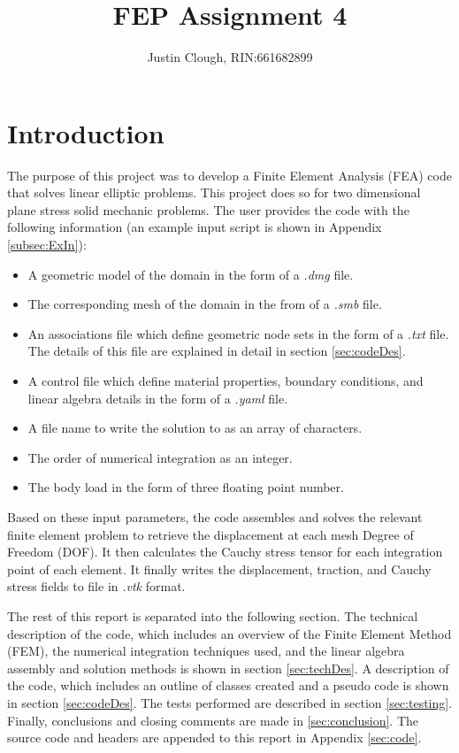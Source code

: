 \documentclass[a4paper, 12pt]{article}
\author{Justin Clough, RIN:661682899}
\title{FEP Assignment 4}
\begin{document}
\maketitle

\newpage
\section{Introduction} \label{sec:intro}
The purpose of this project was to develop a Finite
Element Analysis (FEA) code that solves linear
elliptic problems. This project does so for
two dimensional plane stress solid mechanic problems. The user
provides the code with the following information
(an example input script is shown in
Appendix \ref{subsec:ExIn}):

\begin{itemize}
  \item A geometric model of the domain in the
        form of a \emph{.dmg} file.
  \item The corresponding mesh of the domain in the
        from of a \emph{.smb} file.
  \item An associations file which define geometric
        node sets in the form of a \emph{.txt} file. The
        details of this file are explained in detail in
        section \ref{sec:codeDes}.
  \item A control file which define material properties,
        boundary conditions, and linear algebra details in
        the form of a \emph{.yaml} file.
  \item A file name to write the solution to as an array of
        characters.
  \item The order of numerical integration as an integer.
  \item The body load in the form of three floating point
        number.
\end{itemize}

Based on these input parameters, the code assembles and
solves the relevant finite element problem to retrieve
the displacement at each mesh Degree of Freedom (DOF).
It then calculates the Cauchy stress tensor for each
integration point of each element. It finally writes
the displacement, traction, and Cauchy stress fields to
file in \emph{.vtk} format.

The rest of this report is separated into the following
section. The technical description of the code, which
includes an overview of the Finite Element Method (FEM),
the numerical integration techniques used, and the
linear algebra assembly and solution methods is shown in
section \ref{sec:techDes}. A description of the code, which
includes an outline of classes created and a pseudo code
is shown in section \ref{sec:codeDes}. The tests performed
are described in section \ref{sec:testing}. Finally,
conclusions and closing comments are made
in \ref{sec:conclusion}. The source code and headers
are appended to this report in Appendix \ref{sec:code}.
\end{document}
